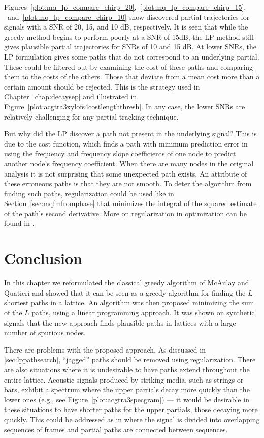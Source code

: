 Figures~\ref{plot:mq_lp_compare_chirp_20},~\ref{plot:mq_lp_compare_chirp_15},%
~and~\ref{plot:mq_lp_compare_chirp_10}
show discovered partial trajectories for signals with a SNR of 20, 15, and 10
dB,
respectively. It is seen that while the greedy method begins to perform poorly
at a SNR of 15dB, the LP method still gives plausible partial trajectories for
SNRs of 10 and 15 dB. At lower SNRs, the LP formulation gives
some paths that do not correspond to an underlying partial. These could be filtered
out by examining the cost of these paths and comparing them to the costs of the
others. Those that deviate from a mean cost more than a certain amount should be
rejected. This is the strategy used in Chapter~\ref{chap:decaysep} and
illustrated in Figure~\ref{plot:acgtra3xylofs4costlengththresh}. In any case,
the lower SNRs are relatively challenging for any partial tracking technique.

But why did the LP discover a path not present in the underlying signal? This is
due to the cost function, which finds a path with minimum prediction error in
using the frequency and frequency slope coefficients of one node to predict
another node's frequency coefficient. When there are many nodes in the original
analysis it is not surprising that some unexpected path exists.  An attribute of
these erroneous paths is that they are not smooth. To deter the algorithm from
finding such paths, regularization could be used like in
Section~\ref{sec:mqfmfromphase} that minimizes the integral of the squared
estimate of the path's second derivative. More on regularization in optimization
can be found in \cite[ch.~6.3]{boyd2004convex}.

\section{Conclusion}

In this chapter we reformulated the classical greedy algorithm of McAulay and
Quatieri and showed that it can be seen as a greedy algorithm for finding the $L$
shortest paths in a lattice. An algorithm was then proposed minimizing the sum
of the $L$ paths, using a linear programming approach. It was shown on synthetic
signals that the new approach finds plausible paths in lattices with a
large number of spurious nodes.

There are problems with the proposed approach. As discussed in
\ref{sec:lppathsearch}, ``jagged'' paths should be removed using regularization.
There are also situations where it is undesirable to have paths extend
throughout the entire lattice. Acoustic signals produced by striking media, such
as strings or bars, exhibit a spectrum where the upper partials decay more
quickly than the lower ones (e.g., see Figure~\ref{plot:acgtra3specgram}) --- it
would be desirable in these situations to have shorter paths for the upper
partials, those decaying more quickly. This could be addressed as in
\cite{depalle1993tracking} where the signal is divided into overlapping sequences of
frames and partial paths are connected between sequences.

